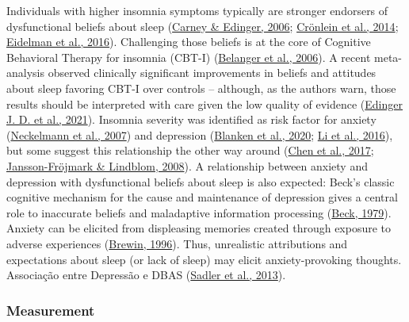 \documentclass[
  ,doc,11pt, twoside,floatsintext]{apa6}
\begin{document}
Individuals with higher insomnia symptoms typically are stronger endorsers of dysfunctional beliefs about sleep (\protect\hyperlink{ref-carney2006}{Carney \& Edinger, 2006}; \protect\hyperlink{ref-cronlein2014}{Crönlein et al., 2014}; \protect\hyperlink{ref-eidelman2016}{Eidelman et al., 2016}). Challenging those beliefs is at the core of Cognitive Behavioral Therapy for insomnia (CBT-I) (\protect\hyperlink{ref-belanger2006}{Belanger et al., 2006}). A recent meta-analysis observed clinically significant improvements in beliefs and attitudes about sleep favoring CBT-I over controls -- although, as the authors warn, those results should be interpreted with care given the low quality of evidence (\protect\hyperlink{ref-edingerjackd.2021}{Edinger J. D. et al., 2021}). Insomnia severity was identified as risk factor for anxiety (\protect\hyperlink{ref-neckelmann2007}{Neckelmann et al., 2007}) and depression (\protect\hyperlink{ref-blanken2020}{Blanken et al., 2020}; \protect\hyperlink{ref-li2016}{Li et al., 2016}), but some suggest this relationship the other way around (\protect\hyperlink{ref-chen2017}{Chen et al., 2017}; \protect\hyperlink{ref-jansson-frojmark2008b}{Jansson-Fröjmark \& Lindblom, 2008}). A relationship between anxiety and depression with dysfunctional beliefs about sleep is also expected: Beck's classic cognitive mechanism for the cause and maintenance of depression gives a central role to inaccurate beliefs and maladaptive information processing (\protect\hyperlink{ref-beck1979cognitive}{Beck, 1979}). Anxiety can be elicited from displeasing memories created through exposure to adverse experiences (\protect\hyperlink{ref-brewin1996theoretical}{Brewin, 1996}). Thus, unrealistic attributions and expectations about sleep (or lack of sleep) may elicit anxiety-provoking thoughts. Associação entre Depressão e DBAS (\protect\hyperlink{ref-sadler2013}{Sadler et al., 2013}).

\hypertarget{measurement}{%
\subsubsection{Measurement}\label{measurement}}
\end{document}
